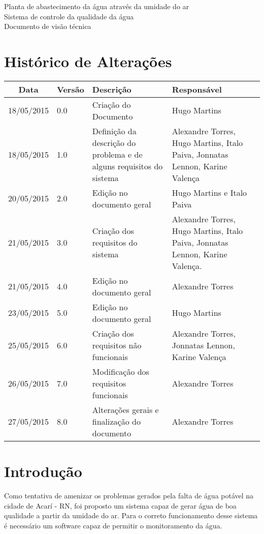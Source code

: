 \documentclass[12pt,openright,oneside,a4paper,brazil]{abntex2}
\title{}
\author{}
\begin{document}
 
 
 \textual
\begin{center}
 {\large Planta de abastecimento da água através da umidade do ar}\\[0.2cm]
 {Sistema de controle da qualidade da água}\\
 {Documento de visão técnica}\\
 \end{center}
 
 \section*{Histórico de Alterações}
\begin{table}[h]
\centering
\begin{tabular}{|c|p{1.5cm}|p{6cm}|p{5cm}|}\hline
\textbf{Data} & \textbf{Versão} & \textbf{Descrição} & \textbf{Responsável}\\
\hline                               
18/05/2015 & 0.0 & Criação do Documento & Hugo Martins\\
\hline
18/05/2015 & 1.0 & Definição da descrição do problema e de alguns requisitos do sistema & Alexandre Torres,  Hugo Martins, Italo Paiva, Jonnatas Lennon, Karine Valença\\
\hline
20/05/2015 & 2.0 &Edição no documento geral& Hugo Martins e Italo Paiva\\
\hline
21/05/2015 & 3.0 & Criação dos requisitos do sistema & Alexandre Torres, Hugo Martins, Italo Paiva, Jonnatas Lennon, Karine Valença.\\
\hline
21/05/2015&	4.0&Edição no documento geral&Alexandre Torres \\ \hline
23/05/2015&	5.0&	Edição no documento geral&Hugo Martins \\ \hline
25/05/2015&	6.0	&Criação dos requisitos não funcionais	&Alexandre Torres,  Jonnatas Lennon, Karine Valença\\ \hline
26/05/2015	& 7.0 &	Modificação dos requisitos funcionais&	Alexandre Torres\\ \hline
27/05/2015	&8.0&	Alterações gerais  e finalização do documento&	Alexandre Torres\\ \hline

\end{tabular}
\end{table}

\section*{Introdução}
Como tentativa de amenizar os problemas gerados pela falta de água potável na cidade de Acarí - RN, foi proposto um sistema capaz de gerar água de boa qualidade a partir da umidade do ar. Para o correto funcionamento desse sistema é necessário um software capaz de permitir o monitoramento da água.
\end{document}

